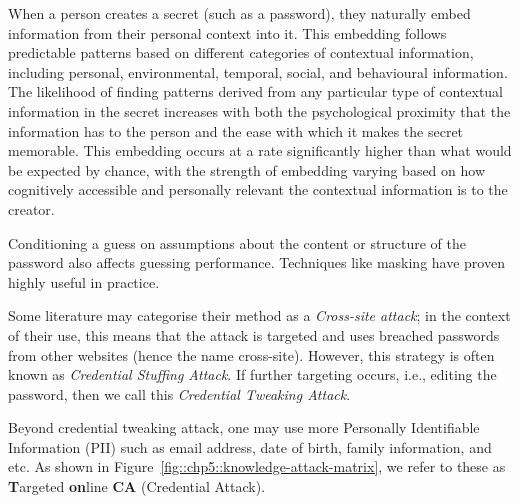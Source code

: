 \begin{conjecture}
When a person creates a secret (such as a password), they naturally embed information from their personal context into it. This embedding follows predictable patterns based on different categories of contextual information, including personal, environmental, temporal, social, and behavioural information. The likelihood of finding patterns derived from any particular type of contextual information in the secret increases with both the psychological proximity that the information has to the person and the ease with which it makes the secret memorable. This embedding occurs at a rate significantly higher than what would be expected by chance, with the strength of embedding varying based on how cognitively accessible and personally relevant the contextual information is to the creator.
\label{conjecture::chp5::contextual-info}
\end{conjecture}



Conditioning a guess on assumptions about the content or structure of the password also affects guessing performance. Techniques like masking have proven highly useful in practice.

Some literature may categorise their method as a \textit{Cross-site attack}; in the context of their use, this means that the attack is targeted and uses breached passwords from other websites (hence the name cross-site). However, this strategy is often known as \textit{Credential Stuffing Attack}. If further targeting occurs, i.e., editing the password, then we call this \textit{Credential Tweaking Attack}.

Beyond credential tweaking attack, one may use more Personally Identifiable Information (PII) such as email address, date of birth, family information, and etc. As shown in Figure~\ref{fig::chp5::knowledge-attack-matrix}, we refer to these as \textbf{T}argeted \textbf{on}line \textbf{CA} (Credential Attack).

